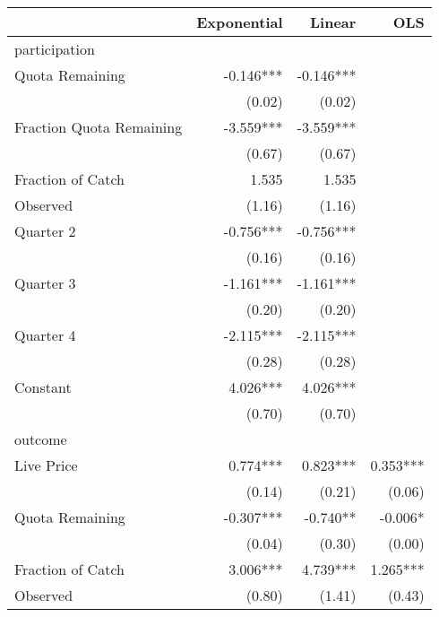 {
\def\sym#1{\ifmmode^{#1}\else\(^{#1}\)\fi}
\begin{tabular}{l*{3}{r}}
\hline\hline
                    & Exponential   &      Linear   &         OLS   \\
\hline
participation       &               &               &               \\
Quota Remaining     &      -0.146***&      -0.146***&               \\
                    &      (0.02)   &      (0.02)   &               \\
Fraction Quota Remaining&      -3.559***&      -3.559***&               \\
                    &      (0.67)   &      (0.67)   &               \\
Fraction of Catch   &       1.535   &       1.535   &               \\
Observed            &      (1.16)   &      (1.16)   &               \\
Quarter 2           &      -0.756***&      -0.756***&               \\
                    &      (0.16)   &      (0.16)   &               \\
Quarter 3           &      -1.161***&      -1.161***&               \\
                    &      (0.20)   &      (0.20)   &               \\
Quarter 4           &      -2.115***&      -2.115***&               \\
                    &      (0.28)   &      (0.28)   &               \\
Constant               &       4.026***&       4.026***&               \\
                    &      (0.70)   &      (0.70)   &               \\
\hline
outcome             &               &               &               \\
Live Price          &       0.774***&       0.823***&       0.353***\\
                    &      (0.14)   &      (0.21)   &      (0.06)   \\
Quota Remaining     &      -0.307***&      -0.740** &      -0.006*  \\
                    &      (0.04)   &      (0.30)   &      (0.00)   \\
Fraction of Catch   &       3.006***&       4.739***&       1.265***\\
Observed            &      (0.80)   &      (1.41)   &      (0.43)   \\

\end{tabular}}
